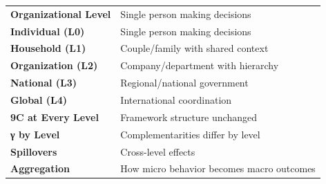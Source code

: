 
\begin{tcolorbox}[colback=blue!5!white, colframe=blue!75!black, title=Key Concepts in This Chapter]
\small
\begin{tabular}{@{}ll@{}}
\textbf{Organizational Level} & Single person making decisions \\
\textbf{Individual (L0)} & Single person making decisions \\
\textbf{Household (L1)} & Couple/family with shared context \\
\textbf{Organization (L2)} & Company/department with hierarchy \\
\textbf{National (L3)} & Regional/national government \\
\textbf{Global (L4)} & International coordination \\
\textbf{9C at Every Level} & Framework structure unchanged \\
\textbf{γ by Level} & Complementarities differ by level \\
\textbf{Spillovers} & Cross-level effects \\
\textbf{Aggregation} & How micro behavior becomes macro outcomes \\
\end{tabular}
\end{tcolorbox}



